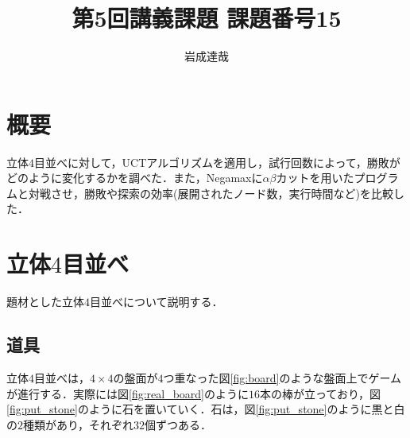 \documentclass{jarticle}
\title{第5回講義課題 課題番号15}
\date{\todayd}
\author{岩成達哉}
\begin{document}
\begin{titlepage}
	\setlength{\topmargin}{1.1in}
	\vspace{100mm}
	\maketitle
\end{titlepage}


\section{概要}
立体$4$目並べに対して，UCTアルゴリズムを適用し，試行回数によって，勝敗がどのように変化するかを調べた．また，Negamaxに$\alpha \beta$カットを用いたプログラムと対戦させ，勝敗や探索の効率(展開されたノード数，実行時間など)を比較した．




\section{立体$4$目並べ}
題材とした立体$4$目並べについて説明する．


\subsection{道具}
立体$4$目並べは，$4 \times 4$の盤面が$4$つ重なった図\ref{fig:board}のような盤面上でゲームが進行する．実際には図\ref{fig:real_board}のように$16$本の棒が立っており，図\ref{fig:put_stone}のように石を置いていく．石は，図\ref{fig:put_stone}のように黒と白の$2$種類があり，それぞれ$32$個ずつある．
\end{document}
